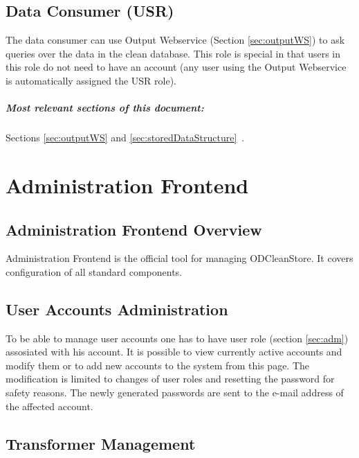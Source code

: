 \section[Data Consumer]{Data Consumer (USR)} 
\label{sec:usr}
  The data consumer can use Output Webservice (Section \ref{sec:outputWS}) to ask queries over the data in the clean database. This role is special in that users in this role do not need to have an account (any user using the Output Webservice is automatically assigned the USR role).

  \paragraph{Most relevant sections of this document:} Sections \ref{sec:outputWS}  and \linebreak[4] \ref{sec:storedDataStructure}~.


\chapter{Administration Frontend}
\label{chap:administrationFrontend}

\section{Administration Frontend Overview}

Administration Frontend is the official tool for managing ODCleanStore. It covers configuration of all standard components.

\section{User Accounts Administration}

To be able to manage user accounts one has to have  user role (section \ref{sec:adm}) assosiated with his account. It is possible to view currently active accounts and modify them or to add new accounts to the system from this page. The modification is limited to changes of user roles and resetting the password for safety reasons. The newly generated passwords are sent to the e-mail address of the affected account.

\section{Transformer Management}
\label{sec:transformerManagement}

